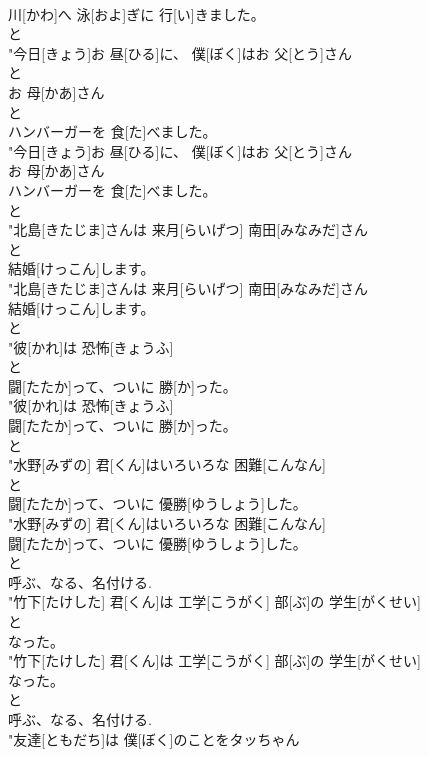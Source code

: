 \documentclass[8pt]{extreport}
\begin{document}
\begin{CJK}{UTF8}{min}
\\	川[かわ]へ 泳[およ]ぎに 行[い]きました。
\\	と
\\	"今日[きょう]お 昼[ひる]に、 僕[ぼく]はお 父[とう]さん
\\	と
\\	お 母[かあ]さん
\\	と
\\	ハンバーガーを 食[た]べました。
\\	"今日[きょう]お 昼[ひる]に、 僕[ぼく]はお 父[とう]さん
\\	お 母[かあ]さん
\\	ハンバーガーを 食[た]べました。
\\	と
\\	"北島[きたじま]さんは 来月[らいげつ] 南田[みなみだ]さん
\\	と
\\	結婚[けっこん]します。
\\	"北島[きたじま]さんは 来月[らいげつ] 南田[みなみだ]さん
\\	結婚[けっこん]します。
\\	と
\\	"彼[かれ]は 恐怖[きょうふ]
\\	と
\\	闘[たたか]って、ついに 勝[か]った。
\\	"彼[かれ]は 恐怖[きょうふ]
\\	闘[たたか]って、ついに 勝[か]った。
\\	と
\\	"水野[みずの] 君[くん]はいろいろな 困難[こんなん]
\\	と
\\	闘[たたか]って、ついに 優勝[ゆうしょう]した。
\\	"水野[みずの] 君[くん]はいろいろな 困難[こんなん]
\\	闘[たたか]って、ついに 優勝[ゆうしょう]した。
\\	と
\\	呼ぶ、なる、名付ける. 
\\	"竹下[たけした] 君[くん]は 工学[こうがく] 部[ぶ]の 学生[がくせい]
\\	と
\\	なった。
\\	"竹下[たけした] 君[くん]は 工学[こうがく] 部[ぶ]の 学生[がくせい]
\\	なった。
\\	と
\\	呼ぶ、なる、名付ける. 
\\	"友達[ともだち]は 僕[ぼく]のことをタッちゃん

\end{CJK}
\end{document}
